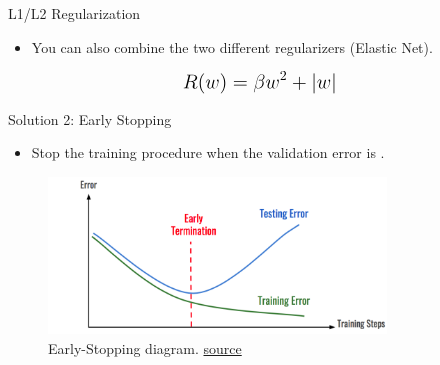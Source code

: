 \begin{frame}{L1/L2 Regularization}
    \begin{itemize}
        \item You can also combine the two different regularizers (Elastic Net).
    \end{itemize}
    \begin{equation*}
        \mathlarger{\mathlarger{
        R(w) = \beta w^2 + \vert w\vert
        }}
    \end{equation*}
\end{frame}

\begin{frame}{Solution 2: Early Stopping}
    \begin{itemize}
        \item Stop the training procedure when the validation error is .
    \end{itemize}
    \begin{figure}
	\centering
	\includegraphics[width=0.8\textwidth]{Figs/Early Stopping.png}
	\caption{Early-Stopping diagram. \href{https://medium.com/analytics-v7idhya/early-stopping-with-pytorch-to-restrain-your-model-from-overfitting-dce6de4081c5}{source}}
    \end{figure}
\end{frame}


